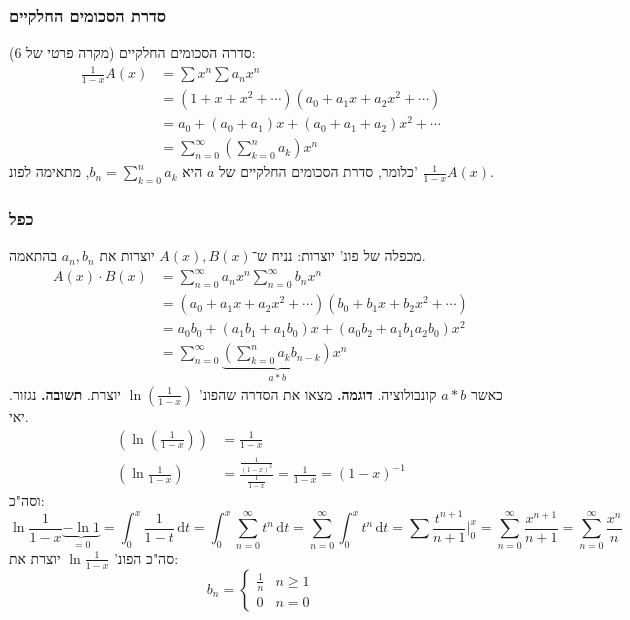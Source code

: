 \documentclass[]{article}
\newcommand\dt    {\,\mathrm{d}t}
\renewcommand\inf {\infty}
\newcommand\nsuminf   {\sum_{n = 0}^\inf}
\newcommand\op    {^{-1}}
\newcommand\cl [1]    {\left ( #1 \right )}
\begin{document}
	\subsubsection{סדרת הסכומים החלקיים}
		(מקרה פרטי של 6) סדרה הסכומים החלקיים: 
		\begin{align*}
			\frac{1}{1 - x}A(x) &= \sum x^n \sum a_nx^n \\
			&= (1 + x + x^2 + \cdots)(a_0 + a_1x + a_2x^2 + \cdots) \\
			&= a_0 + (a_0 + a_1)x + (a_0 + a_1 + a_2)x^2 + \cdots \\
			&= \nsuminf \cl{\sum_{k = 0}^{n} a_k}x^{n}
		\end{align*}
		כלומר, סדרת הסכומים החלקיים של $a$ היא $b_n = \sum_{k = 0}^{n}a_k$, מתאימה לפונ' $\frac{1}{1 - x}A(x)$. 
	\subsubsection{כפל}
		מכפלה של פונ' יוצרות: נניח ש־$A(x), B(x)$ יוצרות את $a_n, b_n$ בהתאמה. 
		\begin{align*}
			A(x) \cdot B(x) &= \nsuminf a_nx^n \nsuminf b_nx^n \\
			&= (a_0 + a_1x + a_2x^2 + \cdots)(b_0 + b_1x + b_2x^2 + \cdots) \\
			&= a_0b_0 + (a_1b_1 + a_1b_0)x + (a_0 b_2 + a_1b_1 a_2b_0)x^2 \\
			&= \sum_{n = 0}^{\inf}\underbrace{\cl{\sum_{k = 0}^{n} a_kb_{n - k}}}_{a * b}x^{n}
		\end{align*}
		כאשר $a * b$ קונבולוציה. 
		\textbf{דוגמה. }מצאו את הסדרה שהפונ' $\ln(\frac{1}{1 - x})$ יוצרת. 
		\textbf{תשובה. }נגזור. יאי. 
		\begin{align*}
			\cl{\ln\cl{\frac{1}{1 - x}}} &= \frac{1}{1 - x} \\
			\cl{\ln \frac{1}{1 - x}} &= \frac{\frac{1}{(1 - x)^{2}}}{\frac{1}{1 - x}} = \frac{1}{1 - x} = (1 - x)\op
		\end{align*}
		וסה"כ: 
		\[ \ln \frac{1}{1 - x} \underbrace{- \ln 1}_{ = 0} = \int_0^x \frac{1}{1 - t}\dt = \int^x_0 \nsuminf t^n\dt = \nsuminf \int^x_0 t^n\dt = \sum \frac{t^{n + 1}}{n + 1}\Bigg\vert^x_0 = \nsuminf \frac{x^{n + 1}}{n + 1} = \nsuminf \frac{x^n}{n} \]
		סה"כ הפונ' $\ln \frac{1}{1 - x}$ יוצרת את: 
		\[ b_n = \begin{cases}
			\frac{1}{n} & n \ge 1 \\
			0 & n = 0
		\end{cases} \]
		
\end{document}
